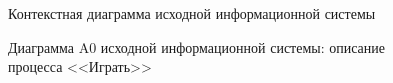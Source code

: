 \begin{figure}[h]
\caption{Контекстная диаграмма исходной информационной системы}
\label{ris:current_context_diagram}
\end{figure}

\begin{figure}[h]
\caption{Диаграмма A0 исходной информационной системы: описание процесса <<Играть>>}
\label{ris:current_a0_diagram}
\end{figure}

